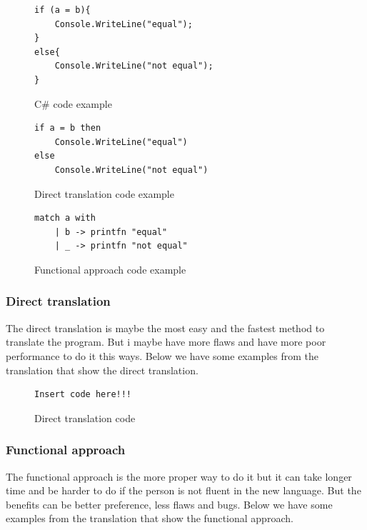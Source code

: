 \documentclass[12pt, a4paper]{article}
\begin{document}
\begin{figure}[!h]
\begin{lstlisting}
if (a = b){
	Console.WriteLine("equal");
}
else{
	Console.WriteLine("not equal");
}
\end{lstlisting}
\caption{C\# code example}
\label{fig:CSharpIf}
\end{figure}

\begin{figure}[!h]
\begin{lstlisting}
if a = b then 
	Console.WriteLine("equal")
else 
	Console.WriteLine("not equal")
\end{lstlisting}
\caption{Direct translation code example}
\label{fig:directTranslationIf}
\end{figure}

\begin{figure}[!h]
\begin{lstlisting}
match a with
    | b -> printfn "equal"
    | _ -> printfn "not equal"
\end{lstlisting}
\caption{Functional approach code example}
\label{fig:functionalApproachIf}
\end{figure}

\newpage

\subsubsection{Direct translation}
The direct translation is maybe the most easy and the fastest method to translate the program. But i maybe have more flaws and have more poor performance to do it this ways. Below we have some examples from the translation that show the direct translation.

\begin{figure}[!h]
\begin{lstlisting}
Insert code here!!!
\end{lstlisting}
\caption{Direct translation code}
\end{figure}

\newpage


\subsubsection{Functional approach}
The functional approach is the more proper way to do it but it can take longer time and be harder to do if the person is not fluent in the new language. But the benefits can be better preference, less flaws and bugs. Below we have some examples from the translation that show the functional approach.
\end{document}
